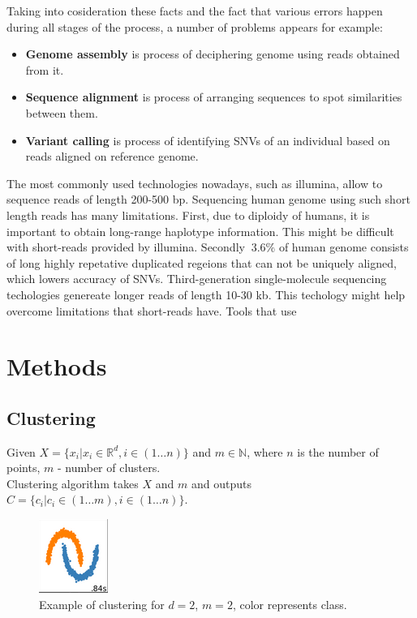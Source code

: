\documentclass[a4paper, 12pt]{article}
\theoremstyle{definition}
\theoremstyle{definition}
\theoremstyle{remark}
\begin{document}
Taking into cosideration these facts and the fact that various 
errors happen during all stages of the process, a number of 
problems appears for example:
\begin{itemize}
    \item \textbf{Genome assembly} is process of  
    deciphering genome using reads obtained from it.
    
    \item \textbf{Sequence alignment} is process of 
    arranging sequences to spot similarities between them. 
    
    \item \textbf{Variant calling} is process of identifying 
    SNVs of an individual based on reads aligned on reference genome.
\end{itemize}

The most commonly used technologies nowadays, 
such as illumina, allow to sequence reads of length 200-500 bp.
Sequencing human genome using such short length reads 
has many limitations. 
First, due to diploidy of humans, it is important to obtain
long-range haplotype information. This might be difficult 
with short-reads provided by illumina. Secondly $~3.6\%$ of 
human genome consists of long highly repetative 
duplicated regeions that can not be uniquely aligned, 
which lowers accuracy of SNVs. 
Third-generation single-molecule sequencing techologies 
genereate longer reads of length 10-30 kb. 
This techology might help overcome limitations that 
short-reads have. Tools that use 

\newpage
\section{Methods}
\subsection{Clustering}

Given $X = \{x_i | x_i \in \mathbb{R}^d, i \in \left( 1 \ldots n \right) \}$ and $m \in \mathbb{N}$,
where $n$ is the number of points, $m$ - number of clusters. \\
Clustering algorithm takes $X$ and $m$ and outputs $C = \{ c_i | c_i \in \left( 1 \ldots m \right), i \in \left( 1 \ldots n \right)\}$.

\begin{figure}[H]
    \includegraphics{example_clustering}
    \centering
    \caption{Example of clustering for $d=2$, $m=2$, color represents class.}
\end{figure}
\end{document}
